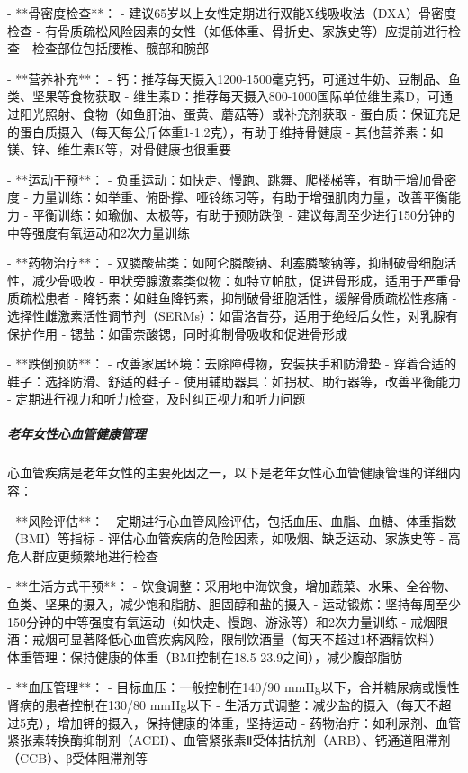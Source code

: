 \begin{enumerate}
- **骨密度检查**：
  - 建议65岁以上女性定期进行双能X线吸收法（DXA）骨密度检查
  - 有骨质疏松风险因素的女性（如低体重、骨折史、家族史等）应提前进行检查
  - 检查部位包括腰椎、髋部和腕部

- **营养补充**：
  - 钙：推荐每天摄入1200-1500毫克钙，可通过牛奶、豆制品、鱼类、坚果等食物获取
  - 维生素D：推荐每天摄入800-1000国际单位维生素D，可通过阳光照射、食物（如鱼肝油、蛋黄、蘑菇等）或补充剂获取
  - 蛋白质：保证充足的蛋白质摄入（每天每公斤体重1-1.2克），有助于维持骨健康
  - 其他营养素：如镁、锌、维生素K等，对骨健康也很重要

- **运动干预**：
  - 负重运动：如快走、慢跑、跳舞、爬楼梯等，有助于增加骨密度
  - 力量训练：如举重、俯卧撑、哑铃练习等，有助于增强肌肉力量，改善平衡能力
  - 平衡训练：如瑜伽、太极等，有助于预防跌倒
  - 建议每周至少进行150分钟的中等强度有氧运动和2次力量训练

- **药物治疗**：
  - 双膦酸盐类：如阿仑膦酸钠、利塞膦酸钠等，抑制破骨细胞活性，减少骨吸收
  - 甲状旁腺激素类似物：如特立帕肽，促进骨形成，适用于严重骨质疏松患者
  - 降钙素：如鲑鱼降钙素，抑制破骨细胞活性，缓解骨质疏松性疼痛
  - 选择性雌激素活性调节剂（SERMs）：如雷洛昔芬，适用于绝经后女性，对乳腺有保护作用
  - 锶盐：如雷奈酸锶，同时抑制骨吸收和促进骨形成

- **跌倒预防**：
  - 改善家居环境：去除障碍物，安装扶手和防滑垫
  - 穿着合适的鞋子：选择防滑、舒适的鞋子
  - 使用辅助器具：如拐杖、助行器等，改善平衡能力
  - 定期进行视力和听力检查，及时纠正视力和听力问题

\subparagraph{老年女性心血管健康管理}

心血管疾病是老年女性的主要死因之一，以下是老年女性心血管健康管理的详细内容：

- **风险评估**：
  - 定期进行心血管风险评估，包括血压、血脂、血糖、体重指数（BMI）等指标
  - 评估心血管疾病的危险因素，如吸烟、缺乏运动、家族史等
  - 高危人群应更频繁地进行检查

- **生活方式干预**：
  - 饮食调整：采用地中海饮食，增加蔬菜、水果、全谷物、鱼类、坚果的摄入，减少饱和脂肪、胆固醇和盐的摄入
  - 运动锻炼：坚持每周至少150分钟的中等强度有氧运动（如快走、慢跑、游泳等）和2次力量训练
  - 戒烟限酒：戒烟可显著降低心血管疾病风险，限制饮酒量（每天不超过1杯酒精饮料）
  - 体重管理：保持健康的体重（BMI控制在18.5-23.9之间），减少腹部脂肪

- **血压管理**：
  - 目标血压：一般控制在140/90 mmHg以下，合并糖尿病或慢性肾病的患者控制在130/80 mmHg以下
  - 生活方式调整：减少盐的摄入（每天不超过5克），增加钾的摄入，保持健康的体重，坚持运动
  - 药物治疗：如利尿剂、血管紧张素转换酶抑制剂（ACEI）、血管紧张素Ⅱ受体拮抗剂（ARB）、钙通道阻滞剂（CCB）、β受体阻滞剂等


\end{enumerate}
